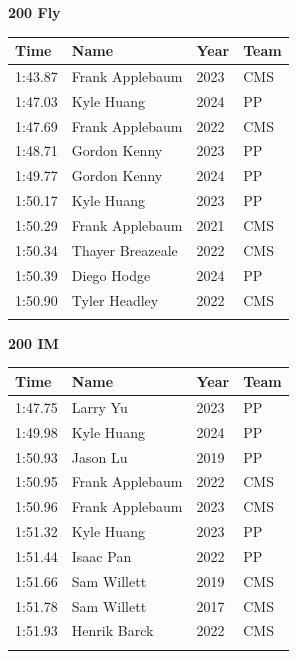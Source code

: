 \vspace{1.2em}
\noindent\begin{minipage}[t]{0.98\textwidth}
\centering
\textbf{\textcolor{teamprimary}{200 Fly}}\par
\vspace{0.5em}
\centering
\small
\renewcommand{\arraystretch}{1.0}
\setlength{\tabcolsep}{4pt}
\begin{tabular}{@{}p{2.5cm}p{4.5cm}p{1.5cm}p{2.5cm}@{}}
\toprule
\textbf{Time} & \textbf{Name} & \textbf{Year} & \textbf{Team} \\
\midrule
1:43.87 & Frank Applebaum & 2023 & CMS \\
1:47.03 & Kyle Huang & 2024 & PP \\
1:47.69 & Frank Applebaum & 2022 & CMS \\
1:48.71 & Gordon Kenny & 2023 & PP \\
1:49.77 & Gordon Kenny & 2024 & PP \\
1:50.17 & Kyle Huang & 2023 & PP \\
1:50.29 & Frank Applebaum & 2021 & CMS \\
1:50.34 & Thayer Breazeale & 2022 & CMS \\
1:50.39 & Diego Hodge & 2024 & PP \\
1:50.90 & Tyler Headley & 2022 & CMS \\
\bottomrule
\vspace{0.5em}
\end{tabular}
\end{minipage}
\vspace{1.2em}
\noindent\begin{minipage}[t]{0.98\textwidth}
\centering
\textbf{\textcolor{teamprimary}{200 IM}}\par
\vspace{0.5em}
\centering
\small
\renewcommand{\arraystretch}{1.0}
\setlength{\tabcolsep}{4pt}
\begin{tabular}{@{}p{2.5cm}p{4.5cm}p{1.5cm}p{2.5cm}@{}}
\toprule
\textbf{Time} & \textbf{Name} & \textbf{Year} & \textbf{Team} \\
\midrule
1:47.75 & Larry Yu & 2023 & PP \\
1:49.98 & Kyle Huang & 2024 & PP \\
1:50.93 & Jason Lu & 2019 & PP \\
1:50.95 & Frank Applebaum & 2022 & CMS \\
1:50.96 & Frank Applebaum & 2023 & CMS \\
1:51.32 & Kyle Huang & 2023 & PP \\
1:51.44 & Isaac Pan & 2022 & PP \\
1:51.66 & Sam Willett & 2019 & CMS \\
1:51.78 & Sam Willett & 2017 & CMS \\
1:51.93 & Henrik Barck & 2022 & CMS \\
\bottomrule
\vspace{0.5em}
\end{tabular}
\end{minipage}
